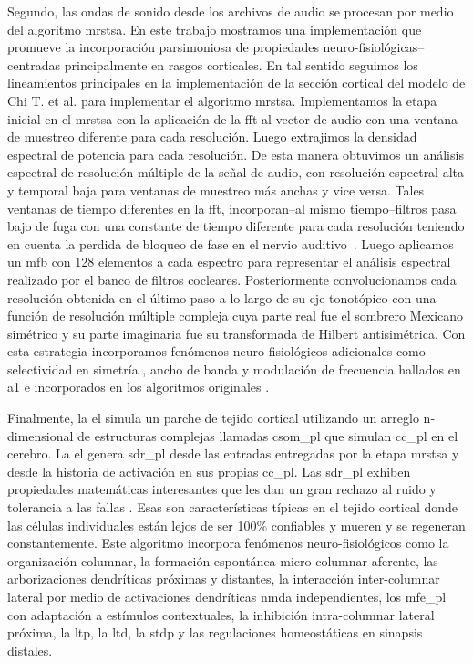 {Segundo, las ondas de sonido desde los archivos de audio se procesan por medio del algoritmo \gls{mrstsa}.
En este trabajo mostramos una implementación que promueve la incorporación parsimoniosa de propiedades neuro-fisiológicas--centradas principalmente en rasgos corticales.
En tal sentido seguimos los lineamientos principales en la implementación de la sección cortical del modelo de Chi T. et al. \cite{chi_2005} para implementar el algoritmo \gls{mrstsa}.
Implementamos la etapa inicial en el \gls{mrstsa} con la aplicación de la \gls{fft} al vector de audio con una ventana de muestreo diferente para cada resolución.
Luego extrajimos la densidad espectral de potencia para cada resolución.
De esta manera obtuvimos un análisis espectral de resolución múltiple de la señal de audio, con resolución espectral alta y temporal baja para ventanas de muestreo más anchas y vice versa.
Tales ventanas de tiempo diferentes en la \gls{fft}, incorporan--al mismo tiempo--filtros pasa bajo de fuga con una constante de tiempo diferente para cada resolución teniendo en cuenta la perdida de bloqueo de fase en el nervio auditivo~\cite{chi_2005}.
Luego aplicamos un \gls{mfb} con 128 elementos a cada espectro para representar el análisis espectral realizado por el banco de filtros cocleares.
Posteriormente convolucionamos cada resolución obtenida en el último paso a lo largo de su eje tonotópico con una función de resolución múltiple compleja cuya parte real fue el sombrero Mexicano simétrico y su parte imaginaria fue su transformada de Hilbert antisimétrica.
Con esta estrategia incorporamos fenómenos neuro-fisiológicos adicionales como selectividad en simetría \cite{shamma_1993}, ancho de banda \cite{schreiner_1990} y modulación de frecuencia \cite{shamma_1993,heil_1992,mendelson_1985} hallados en \gls{a1} e incorporados en los algoritmos originales \cite{wang_1995}.

Finalmente, la \gls{el} simula un parche de tejido cortical utilizando un arreglo n-dimensional de estructuras complejas llamadas \gls{csom_pl} que simulan \gls{cc_pl} en el cerebro.
La \gls{el} genera \gls{sdr_pl} \cite{ahmad_2016} desde las entradas entregadas por la etapa \gls{mrstsa} y desde la historia de activación en sus propias \gls{cc_pl}.
Las \gls{sdr_pl} exhiben propiedades matemáticas interesantes que les dan un gran rechazo al ruido y tolerancia a las fallas \cite{DBLP:journals/corr/AhmadH15}.
Esas son características típicas en el tejido cortical donde las células individuales están lejos de ser 100\% confiables y mueren y se regeneran constantemente.
Este algoritmo incorpora fenómenos neuro-fisiológicos como la organización columnar, la formación espontánea micro-columnar aferente, las arborizaciones dendríticas próximas y distantes, la interacción inter-columnar lateral por medio de activaciones dendríticas \gls{nmda} independientes, los \gls{mfe_pl} con adaptación a estímulos contextuales, la inhibición intra-columnar lateral próxima, la \gls{ltp}, la \gls{ltd}, la \gls{stdp} y las regulaciones homeostáticas en sinapsis distales.

}
